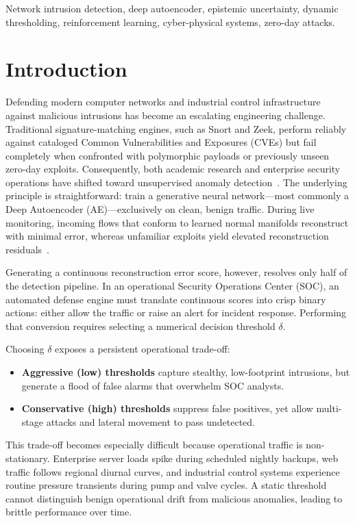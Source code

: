 \documentclass[conference]{IEEEtran}
\begin{document}
\begin{IEEEkeywords}
Network intrusion detection, deep autoencoder, epistemic uncertainty, dynamic thresholding, reinforcement learning, cyber-physical systems, zero-day attacks.
\end{IEEEkeywords}

\section{Introduction}
Defending modern computer networks and industrial control infrastructure against malicious intrusions has become an escalating engineering challenge. Traditional signature-matching engines, such as Snort and Zeek, perform reliably against cataloged Common Vulnerabilities and Exposures (CVEs) but fail completely when confronted with polymorphic payloads or previously unseen zero-day exploits. Consequently, both academic research and enterprise security operations have shifted toward unsupervised anomaly detection~\cite{pang2021deep}. The underlying principle is straightforward: train a generative neural network—most commonly a Deep Autoencoder (AE)—exclusively on clean, benign traffic. During live monitoring, incoming flows that conform to learned normal manifolds reconstruct with minimal error, whereas unfamiliar exploits yield elevated reconstruction residuals~\cite{mirsky2018kitsune}.

Generating a continuous reconstruction error score, however, resolves only half of the detection pipeline. In an operational Security Operations Center (SOC), an automated defense engine must translate continuous scores into crisp binary actions: either allow the traffic or raise an alert for incident response. Performing that conversion requires selecting a numerical decision threshold $\delta$.

Choosing $\delta$ exposes a persistent operational trade-off:
\begin{itemize}
    \item \textbf{Aggressive (low) thresholds} capture stealthy, low-footprint intrusions, but generate a flood of false alarms that overwhelm SOC analysts.
    \item \textbf{Conservative (high) thresholds} suppress false positives, yet allow multi-stage attacks and lateral movement to pass undetected.
\end{itemize}

This trade-off becomes especially difficult because operational traffic is non-stationary. Enterprise server loads spike during scheduled nightly backups, web traffic follows regional diurnal curves, and industrial control systems experience routine pressure transients during pump and valve cycles. A static threshold cannot distinguish benign operational drift from malicious anomalies, leading to brittle performance over time.
\end{document}
